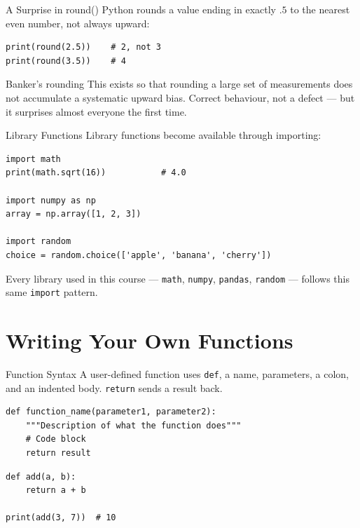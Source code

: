 \documentclass[9pt,aspectratio=169,xcolor=table]{beamer}
\begin{document}
\begin{frame}[fragile]{A Surprise in round()}
    \leavevmode
    Python rounds a value ending in exactly $.5$ to the nearest
    \alert{even} number, not always upward:

\begin{lstlisting}
print(round(2.5))    # 2, not 3
print(round(3.5))    # 4
\end{lstlisting}

    \vspace{3mm}
    \begin{block}{Banker's rounding}
        This exists so that rounding a large set of measurements does
        not accumulate a systematic upward bias. Correct behaviour, not
        a defect --- but it surprises almost everyone the first time.
    \end{block}
\end{frame}

\begin{frame}[fragile]{Library Functions}
    \leavevmode
    Library functions become available through \alert{importing}:

\begin{lstlisting}
import math
print(math.sqrt(16))           # 4.0

import numpy as np
array = np.array([1, 2, 3])

import random
choice = random.choice(['apple', 'banana', 'cherry'])
\end{lstlisting}

    \vspace{1mm}
    {\small Every library used in this course --- \texttt{math},
    \texttt{numpy}, \texttt{pandas}, \texttt{random} --- follows this
    same \texttt{import} pattern.}
\end{frame}

\section{Writing Your Own Functions}

\begin{frame}[fragile]{Function Syntax}
    \leavevmode
    A user-defined function uses \texttt{def}, a name, parameters, a
    colon, and an indented body. \texttt{return} sends a result back.

\begin{lstlisting}
def function_name(parameter1, parameter2):
    """Description of what the function does"""
    # Code block
    return result
\end{lstlisting}

\begin{lstlisting}
def add(a, b):
    return a + b

print(add(3, 7))  # 10
\end{lstlisting}
\end{frame}
\end{document}
